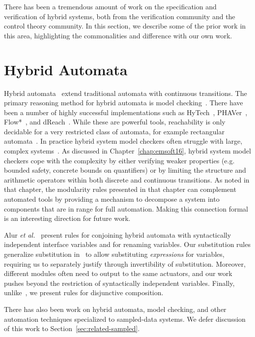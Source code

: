 There has been a tremendous amount of work on the specification and
verification of hybrid systems, both from the verification community and
the control theory community.  In this section, we describe some of the
prior work in this area, highlighting the commonalities and difference with
our own work.

\section{Hybrid Automata}
Hybrid automata~\cite{Henzinger96theoryhybrid,Lynch03IO} extend traditional
automata with continuous transitions.  The primary reasoning method for
hybrid automata is model checking~\cite{PHAVerSTTT08,HyTechCAV97}.  There
have been a number of highly successful implementations such as
\textsf{HyTech}~\cite{HyTechCAV97}, \textsf{PHAVer}~\cite{PHAVerSTTT08},
Flow*~\cite{chen2015flow}, and dReach~\cite{kong2015dreach}. While these
are powerful tools, reachability is only decidable for a very restricted
class of automata, for example rectangular automata~\cite{HenzingerKPV98}.
In practice hybrid system model checkers often struggle with large, complex
systems~\cite{muller2000modelling}. As discussed in
Chapter~\ref{chap:emsoft16}, hybrid system model checkers cope with the
complexity by either verifying weaker properties (e.g. bounded safety,
concrete bounds on quantifiers) or by limiting the structure and arithmetic
operators within both discrete and continuous transitions. As noted in that
chapter, the modularity rules presented in that chapter can complement
automated tools by providing a mechanism to decompose a system into
components that are in range for full automation. Making this connection
formal is an interesting direction for future work.

Alur \emph{et al.}~\cite{alur1997modularity} present rules for conjoining
hybrid automata with syntactically independent interface variables and for
renaming variables. Our substitution rules generalize substitution
in~\cite{alur1997modularity} to allow substituting \emph{expressions} for
variables, requiring us to separately justify \progress{} through
invertibility of substitution.  Moreover, different modules often need to
output to the same actuators, and our work pushes beyond the restriction of
syntactically independent variables.  Finally,
unlike~\cite{alur1997modularity}, we present rules for disjunctive
composition.

There has also been work on hybrid automata, model checking, and other
automation techniques specialized to sampled-data systems. We defer
discussion of this work to Section~\ref{sec:related-sampled}.

